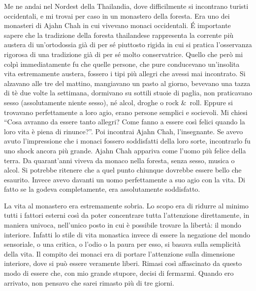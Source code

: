 Me ne andai nel Nordest della Thailandia, dove difficilmente si incontrano turisti occidentali, e mi trovai per caso in un monastero della foresta. Era uno dei monasteri di Ajahn Chah in cui vivevano monaci occidentali. É importante sapere che la tradizione della foresta thailandese rappresenta la corrente più austera di un'ortodossia già di per sé piuttosto rigida in cui si pratica l'osservanza rigorosa di una tradizione già di per sé molto conservatrice. Quello che però mi colpì immediatamente fu che quelle persone, che pure conducevano un'insolita vita estremamente austera, fossero i tipi più allegri che avessi mai incontrato. Si alzavano alle tre del mattino, mangiavano un pasto al giorno, bevevano una tazza di tè due volte la settimana, dormivano su sottili stuoie di paglia, non praticavano sesso (assolutamente niente sesso), né alcol, droghe o rock \&\ roll. Eppure si trovavano perfettamente a loro agio, erano persone semplici e socievoli. Mi chiesi ``Cosa avranno da essere tanto allegri? Come fanno a essere così felici quando la loro vita è piena di rinunce?''. Poi incontrai Ajahn Chah, l'insegnante. Se avevo avuto l'impressione che i monaci fossero soddisfatti della loro sorte, incontrarlo fu uno shock ancora più grande. Ajahn Chah appariva come l'uomo più felice della terra. Da quarant'anni viveva da monaco nella foresta, senza sesso, musica o alcol. Si potrebbe ritenere che a quel punto chiunque dovrebbe essere bello che esaurito. Invece avevo davanti un uomo perfettamente a suo agio con la vita. Di fatto se la godeva completamente, era assolutamente soddisfatto.

La vita al monastero era estremamente sobria. Lo scopo era di ridurre al minimo tutti i fattori esterni così da poter concentrare tutta l'attenzione direttamente, in maniera univoca, nell'unico posto in cui è possibile trovare la libertà: il mondo interiore. Infatti lo stile di vita monastica invece di essere la negazione del mondo sensoriale, o una critica, o l'odio o la paura per esso, si basava sulla semplicità della vita. Il compito dei monaci era di portare l'attenzione sulla dimensione interiore, dove si può essere veramente liberi. Rimasi così affascinato da questo modo di essere che, con mio grande stupore, decisi di fermarmi. Quando ero arrivato, non pensavo che sarei rimasto più di tre giorni.

